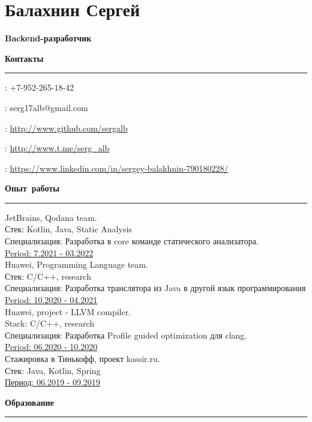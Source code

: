 \documentclass[12pt, a4paper]{report}
\author{Балахнин Сергей}
\begin{document}
    \section*{Балахнин Сергей}

    {\large\textbf{Backend-разработчик}}

    \hbox{\large\textbf{Контакты}}\kern5pt\hrule\kern5pt

    \faPhone: +7-952-265-18-42

    \Letter: serg17alb@gmail.com

    \faGithub: \url{http://www.github.com/sergalb}

    \faSend: \url{http://www.t.me/serg_alb}

    \faLinkedinSquare: \url{https://www.linkedin.com/in/sergey-balakhnin-790180228/}\\


    \par\hbox{\large\textbf{Опыт работы}}\kern3pt\hrule\kern10pt
    JetBrains, Qodana team. \\
    Стек: Kotlin, Java, Static Analysis \\
    Специализация: Разработка в core команде статического анализатора.\\
    \underline{Period: 7.2021 - 03.2022} \\

    Huawei, Programming Language team. \\
    Стек: C/C++, research \\
    Специализация: Разработка транслятора из Java в другой язык программирования\\
    \underline{Period: 10.2020 - 04.2021} \\

    Huawei, project - LLVM compiler. \\
    Stack: C/C++, research \\
    Специализация: Разработка Profile guided optimization для clang.\\
    \underline{Period: 06.2020 - 10.2020} \\

    Стажировка в Тинькофф, проект kassir.ru. \\
    Стек: Java, Kotlin, Spring \\
    \underline{Период: 06.2019 - 09.2019} \\

    \par\hbox{\large\textbf{Образование}}\kern5pt\hrule\kern5pt
\end{document}
